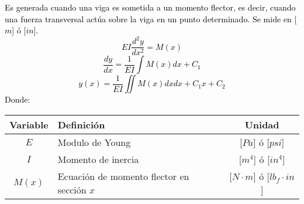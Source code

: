 \documentclass[letterpaper,11pt]{extarticle}
\newcommand{\mybox}[2]
{
    \begin{tcolorbox}[colback=color!5!white,colframe=color!75!black,boxsep=1pt,arc=0pt,outer arc=0pt,title={\textcolor{white}{#1}}]
        \textcolor{black}{#2}
    \end{tcolorbox}
}
\begin{document}
\begin{multicols}{2}
        \mybox{Deformacion por flexión:}
        {
            Es generada cuando una viga es sometida a un momento flector, es decir, cuando una fuerza transversal actúa sobre la viga en un punto determinado. Se mide en [$m$] ó [$in$].
            \begin{equation}
                EI\frac{d^2y}{dx^2} = M(x)
            \end{equation}
            \begin{equation}
                \frac{dy}{dx} = \frac{1}{EI}\int M(x)dx + C_1
            \end{equation}
            \begin{equation}
                y(x) = \frac{1}{EI}\iint M(x)dxdx + C_1x + C_2
            \end{equation}
            Donde:
            \begin{center}
                \begin{tabular}{ c | p{25mm} | c }
                    \hline Variable & Definición & Unidad \\ \hline 
                    $E$ & Modulo de Young & [$Pa$] ó [$psi$]\\
                    $I$ & Momento de inercia & [$m^4$] ó [$in^4$]\\
                    $M(x)$ & Ecuación de momento flector en sección $x$ & [$N \cdot m$] ó [$lb_f \cdot in$]\\ \hline
                \end{tabular}
            \end{center}
        }
    \end{multicols}
\end{document}

